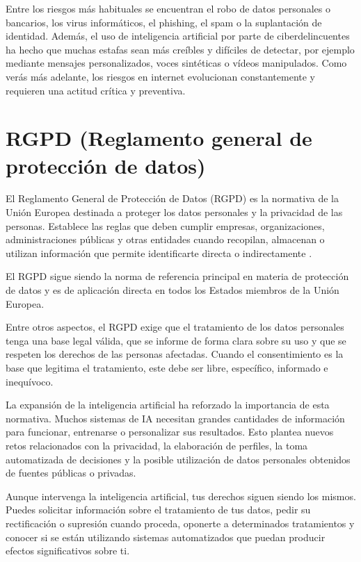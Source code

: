 \documentclass[
  spanish,
  a4paper,
  openany]{book}
\begin{document}
Entre los riesgos más habituales se encuentran el robo de datos personales o bancarios, los virus informáticos, el phishing, el spam o la suplantación de identidad. Además, el uso de inteligencia artificial por parte de ciberdelincuentes ha hecho que muchas estafas sean más creíbles y difíciles de detectar, por ejemplo mediante mensajes personalizados, voces sintéticas o vídeos manipulados. Como verás más adelante, los riesgos en internet evolucionan constantemente y requieren una actitud crítica y preventiva.

\section{RGPD (Reglamento general de protección de datos)}\label{rgpd-reglamento-general-de-protecciuxf3n-de-datos}

El Reglamento General de Protección de Datos (RGPD) es la normativa de la Unión Europea destinada a proteger los datos personales y la privacidad de las personas. Establece las reglas que deben cumplir empresas, organizaciones, administraciones públicas y otras entidades cuando recopilan, almacenan o utilizan información que permite identificarte directa o indirectamente \citep{WIKI-rgpd}.

El RGPD sigue siendo la norma de referencia principal en materia de protección de datos y es de aplicación directa en todos los Estados miembros de la Unión Europea.

Entre otros aspectos, el RGPD exige que el tratamiento de los datos personales tenga una base legal válida, que se informe de forma clara sobre su uso y que se respeten los derechos de las personas afectadas. Cuando el consentimiento es la base que legitima el tratamiento, este debe ser libre, específico, informado e inequívoco.

La expansión de la inteligencia artificial ha reforzado la importancia de esta normativa. Muchos sistemas de IA necesitan grandes cantidades de información para funcionar, entrenarse o personalizar sus resultados. Esto plantea nuevos retos relacionados con la privacidad, la elaboración de perfiles, la toma automatizada de decisiones y la posible utilización de datos personales obtenidos de fuentes públicas o privadas.

Aunque intervenga la inteligencia artificial, tus derechos siguen siendo los mismos. Puedes solicitar información sobre el tratamiento de tus datos, pedir su rectificación o supresión cuando proceda, oponerte a determinados tratamientos y conocer si se están utilizando sistemas automatizados que puedan producir efectos significativos sobre ti.
\end{document}
